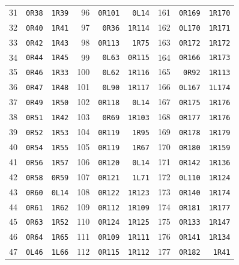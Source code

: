 {\begin{longtable}{@{}rrr@{\hspace{18pt}}rrr@{\hspace{18pt}}rrr@{}}
31 & \texttt{0R38} & \texttt{1R39} & 96 & \texttt{0R101} & \texttt{0L14} & 161 & \texttt{0R169} & \texttt{1R170}\\
32 & \texttt{0R40} & \texttt{1R41} & 97 & \texttt{0R36} & \texttt{1R114} & 162 & \texttt{0L170} & \texttt{1R171}\\
33 & \texttt{0R42} & \texttt{1R43} & 98 & \texttt{0R113} & \texttt{1R75} & 163 & \texttt{0R172} & \texttt{1R172}\\
34 & \texttt{0R44} & \texttt{1R45} & 99 & \texttt{0L63} & \texttt{0R115} & 164 & \texttt{0R166} & \texttt{1R173}\\
35 & \texttt{0R46} & \texttt{1R33} & 100 & \texttt{0L62} & \texttt{1R116} & 165 & \texttt{0R92} & \texttt{1R113}\\
36 & \texttt{0R47} & \texttt{1R48} & 101 & \texttt{0L90} & \texttt{1R117} & 166 & \texttt{0L167} & \texttt{1L174}\\
37 & \texttt{0R49} & \texttt{1R50} & 102 & \texttt{0R118} & \texttt{0L14} & 167 & \texttt{0R175} & \texttt{1R176}\\
38 & \texttt{0R51} & \texttt{1R42} & 103 & \texttt{0R69} & \texttt{1R103} & 168 & \texttt{0R177} & \texttt{1R176}\\
39 & \texttt{0R52} & \texttt{1R53} & 104 & \texttt{0R119} & \texttt{1R95} & 169 & \texttt{0R178} & \texttt{1R179}\\
40 & \texttt{0R54} & \texttt{1R55} & 105 & \texttt{0R119} & \texttt{1R67} & 170 & \texttt{0R180} & \texttt{1R159}\\
41 & \texttt{0R56} & \texttt{1R57} & 106 & \texttt{0R120} & \texttt{0L14} & 171 & \texttt{0R142} & \texttt{1R136}\\
42 & \texttt{0R58} & \texttt{0R59} & 107 & \texttt{0R121} & \texttt{1L71} & 172 & \texttt{0L110} & \texttt{1R124}\\
43 & \texttt{0R60} & \texttt{0L14} & 108 & \texttt{0R122} & \texttt{1R123} & 173 & \texttt{0R140} & \texttt{1R174}\\
44 & \texttt{0R61} & \texttt{1R62} & 109 & \texttt{0R112} & \texttt{1R109} & 174 & \texttt{0R181} & \texttt{1R177}\\
45 & \texttt{0R63} & \texttt{1R52} & 110 & \texttt{0R124} & \texttt{1R125} & 175 & \texttt{0R133} & \texttt{1R147}\\
46 & \texttt{0R64} & \texttt{1R65} & 111 & \texttt{0R109} & \texttt{1R111} & 176 & \texttt{0R141} & \texttt{1R134}\\
47 & \texttt{0L46} & \texttt{1L66} & 112 & \texttt{0R115} & \texttt{1R112} & 177 & \texttt{0R182} & \texttt{1R41}\\

\end{longtable}}
